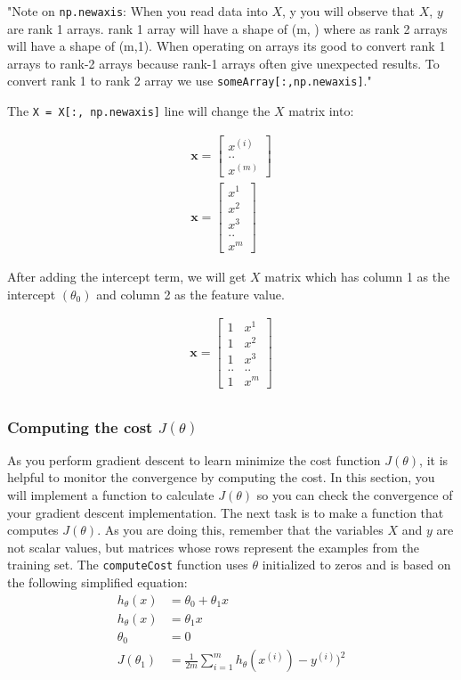 \documentclass{article}
\begin{document}
"Note on \texttt{np.newaxis}: When you read data into $X$, y you will observe that $X$, $y$ are rank 1 arrays. rank 1 array will have a shape of (m, ) where as rank 2 arrays will have a shape of (m,1). When operating on arrays its good to convert rank 1 arrays to rank-2 arrays because rank-1 arrays often give unexpected results. To convert rank 1 to rank 2 array we use \texttt{someArray[:,np.newaxis]}." \citep{srikar2018}

The \texttt{X = X[:, np.newaxis]} line will change the $X$ matrix into:

\begin{align}
  \mathbf x = \begin{bmatrix} x^{(i)} \\ .. \\ x^{(m)}  
  \end{bmatrix} \\
  \mathbf x = \begin{bmatrix} x^1 \\ x^2 \\ x^3 \\ .. \\ x^m\end{bmatrix}
\end{align}

After adding the intercept term, we will get $X$ matrix which has column 1 as the intercept $(\theta_0)$ and column 2 as the feature value.

\begin{align}
  \mathbf x = \begin{bmatrix} 1 & x^1 \\ 1 & x^2 \\ 1 & x^3 \\ .. & .. \\ 1 & x^m\end{bmatrix} \\
\end{align}

\subsubsection{Computing the cost $J(\theta)$}
As you perform gradient descent to learn minimize the cost function $J(\theta)$, it is helpful to monitor the convergence by computing the cost. In this section, you will implement a function to calculate $J(\theta)$ so you can check the convergence of your gradient descent implementation.
The next task is to make a function that computes $J(\theta)$. As you are doing this, remember that the variables $X$ and $y$ are not scalar values, but matrices whose rows represent the examples from the training set.
The \texttt{computeCost} function uses $\theta$ initialized to zeros and is based on the following simplified equation:
\begin{align}
    h_\theta(x) & = \theta_0 + \theta_1x  \\
    h_\theta(x) & = \theta_1x  \\
    \theta_0 & = 0 \\
    J(\theta_1) & = \frac{1}{2m}\sum_{i=1}^m{h_\theta(x^{(i)})-y^{(i)})^2}
\end{align}
\end{document}

